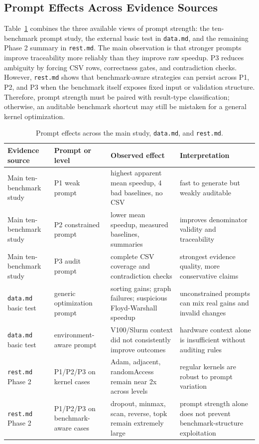 \documentclass[conference]{IEEEtran}
\begin{document}
\subsection{Prompt Effects Across Evidence Sources}

Table~\ref{tab:prompt_effects} combines the three available views of prompt strength: the ten-benchmark prompt study, the external basic test in \texttt{data.md}, and the remaining Phase 2 summary in \texttt{rest.md}. The main observation is that stronger prompts improve traceability more reliably than they improve raw speedup. P3 reduces ambiguity by forcing CSV rows, correctness gates, and contradiction checks. However, \texttt{rest.md} shows that benchmark-aware strategies can persist across P1, P2, and P3 when the benchmark itself exposes fixed input or validation structure. Therefore, prompt strength must be paired with result-type classification; otherwise, an auditable benchmark shortcut may still be mistaken for a general kernel optimization.

\begin{table}[t]
\centering
\caption{Prompt effects across the main study, \texttt{data.md}, and \texttt{rest.md}.}
\label{tab:prompt_effects}
\small
\begin{tabularx}{\textwidth}{l l X X}
\hline
Evidence source & Prompt or level & Observed effect & Interpretation \\
\hline
Main ten-benchmark study & P1 weak prompt & highest apparent mean speedup, 4 bad baselines, no CSV & fast to generate but weakly auditable \\
Main ten-benchmark study & P2 constrained prompt & lower mean speedup, measured baselines, summaries & improves denominator validity and traceability \\
Main ten-benchmark study & P3 audit prompt & complete CSV coverage and contradiction checks & strongest evidence quality, more conservative claims \\
\texttt{data.md} basic test & generic optimization prompt & sorting gains; graph failures; suspicious Floyd-Warshall speedup & unconstrained prompts can mix real gains and invalid changes \\
\texttt{data.md} basic test & environment-aware prompt & V100/Slurm context did not consistently improve outcomes & hardware context alone is insufficient without auditing rules \\
\texttt{rest.md} Phase 2 & P1/P2/P3 on kernel cases & Adam, adjacent, randomAccess remain near 2x across levels & regular kernels are robust to prompt variation \\
\texttt{rest.md} Phase 2 & P1/P2/P3 on benchmark-aware cases & dropout, minmax, scan, reverse, topk remain extremely large & prompt strength alone does not prevent benchmark-structure exploitation \\
\hline
\end{tabularx}
\end{table}
\end{document}
